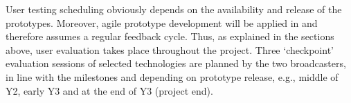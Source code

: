 User testing scheduling obviously depends on the availability and release of the prototypes. Moreover, agile prototype development will be applied in \SUMMA and therefore assumes a regular feedback cycle. Thus, as explained in the sections above, user evaluation takes place throughout the project.  Three `checkpoint’ evaluation sessions of selected technologies are planned by the two broadcasters, in line with the milestones and depending on prototype release, e.g., middle of Y2, early Y3 and at the end of Y3 (project end).



 


